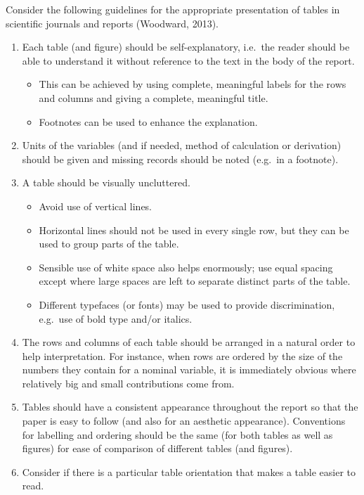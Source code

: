 \documentclass[
  a4paper,
]{memoir}
\providecommand{\tightlist}{%
  \setlength{\itemsep}{0pt}\setlength{\parskip}{0pt}}\usepackage{longtable,booktabs,array}
\begin{document}
Consider the following guidelines for the appropriate presentation of
tables in scientific journals and reports (Woodward, 2013).

\begin{enumerate}
\def\labelenumi{\arabic{enumi}.}
\tightlist
\item
  Each table (and figure) should be self-explanatory, i.e.~the reader
  should be able to understand it without reference to the text in the
  body of the report.

  \begin{itemize}
  \tightlist
  \item
    This can be achieved by using complete, meaningful labels for the
    rows and columns and giving a complete, meaningful title.
  \item
    Footnotes can be used to enhance the explanation.
  \end{itemize}
\item
  Units of the variables (and if needed, method of calculation or
  derivation) should be given and missing records should be noted
  (e.g.~in a footnote).
\item
  A table should be visually uncluttered.

  \begin{itemize}
  \tightlist
  \item
    Avoid use of vertical lines.
  \item
    Horizontal lines should not be used in every single row, but they
    can be used to group parts of the table.
  \item
    Sensible use of white space also helps enormously; use equal spacing
    except where large spaces are left to separate distinct parts of the
    table.
  \item
    Different typefaces (or fonts) may be used to provide
    discrimination, e.g.~use of bold type and/or italics.
  \end{itemize}
\item
  The rows and columns of each table should be arranged in a natural
  order to help interpretation. For instance, when rows are ordered by
  the size of the numbers they contain for a nominal variable, it is
  immediately obvious where relatively big and small contributions come
  from.
\item
  Tables should have a consistent appearance throughout the report so
  that the paper is easy to follow (and also for an aesthetic
  appearance). Conventions for labelling and ordering should be the same
  (for both tables as well as figures) for ease of comparison of
  different tables (and figures).
\item
  Consider if there is a particular table orientation that makes a table
  easier to read.
\end{enumerate}
\end{document}

